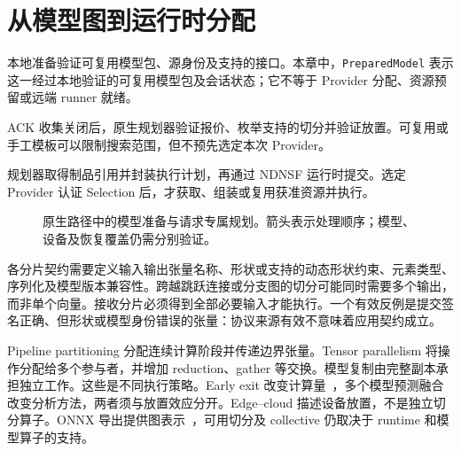 \section{从模型图到运行时分配}
本地准备验证可复用模型包、源身份及支持的接口。本章中，\texttt{PreparedModel} 表示这一经过本地验证的可复用模型包及会话状态；它不等于 Provider 分配、资源预留或远端 runner 就绪。

ACK 收集关闭后，原生规划器验证报价、枚举支持的切分并验证放置。可复用或手工模板可以限制搜索范围，但不预先选定本次 Provider。

规划器取得制品引用并封装执行计划，再通过 NDNSF 运行时提交。选定 Provider 认证 Selection 后，才获取、组装或复用获准资源并执行。

\begin{figure}[htbp]\singlespacing\centering
{}
\caption{原生路径中的模型准备与请求专属规划。箭头表示处理顺序；模型、设备及恢复覆盖仍需分别验证。}
\end{figure}

各分片契约需要定义输入输出张量名称、形状或支持的动态形状约束、元素类型、序列化及模型版本兼容性。跨越跳跃连接或分支图的切分可能同时需要多个输出，而非单个向量。接收分片必须得到全部必要输入才能执行。一个有效反例是提交签名正确、但形状或模型身份错误的张量：协议来源有效不意味着应用契约成立。

Pipeline partitioning 分配连续计算阶段并传递边界张量。Tensor parallelism 将操作分配给多个参与者，并增加 reduction、gather 等交换。模型复制由完整副本承担独立工作。这些是不同执行策略。Early exit 改变计算量~\cite{branchynet}，多个模型预测融合改变分析方法，两者须与放置效应分开。Edge--cloud 描述设备放置，不是独立切分算子。ONNX 导出提供图表示~\cite{onnx}，可用切分及 collective 仍取决于 runtime 和模型算子的支持。

